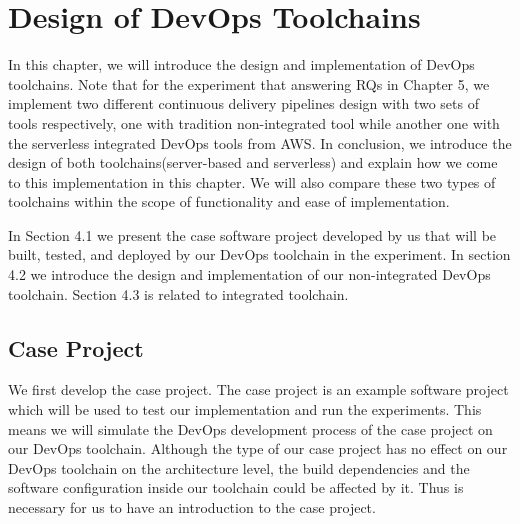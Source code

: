 \chapter{Design of DevOps Toolchains}
In this chapter, we will introduce the design and implementation of DevOps toolchains.
Note that for the experiment that answering RQs in Chapter 5, we implement two different continuous delivery pipelines design with two sets of tools respectively, one with tradition non-integrated tool while another one with the serverless integrated DevOps tools from AWS. In conclusion, we introduce the design of both toolchains(server-based and serverless) and explain how we come to this implementation in this chapter. 
We will also compare these two types of toolchains within the scope of functionality and ease of implementation.
\par
In Section 4.1 we present the case software project developed by us that will be built, tested, and deployed by our DevOps toolchain in the experiment. In section 4.2 we introduce the design and implementation of our non-integrated DevOps toolchain. Section 4.3 is related to integrated toolchain.
\section{Case Project}
We first develop the case project. The case project is an example software project which will be used to test our implementation and run the experiments. This means we will simulate the DevOps development process of the case project on our DevOps toolchain. Although the type of our case project has no effect on our DevOps toolchain on the architecture level, the build dependencies and the software configuration inside our toolchain could be affected by it. Thus is necessary for us to have an introduction to the case project.
